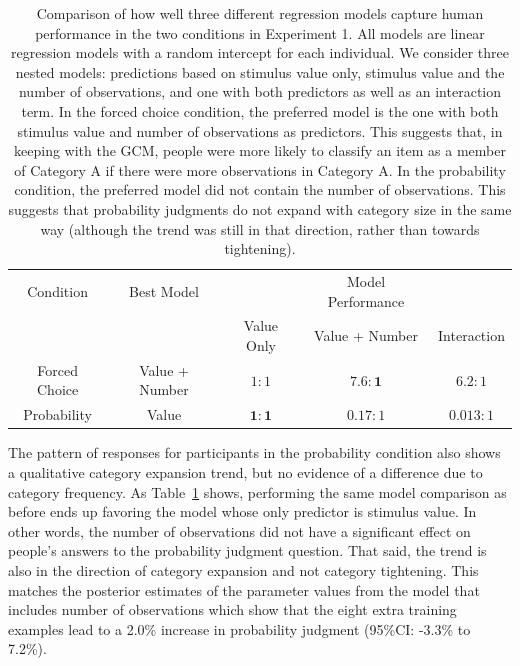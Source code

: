 \documentclass[doc,apacite]{apa6}
\begin{document}
\begin{table}[t]
  \centering
  \begin{tabular}{ccccc} %
    \toprule
    Condition & Best Model & & Model Performance & \\
    \cmidrule(lr){3-5}
    & & Value Only & Value + Number & Interaction \\
    \midrule
    Forced Choice & Value + Number & $ 1 : 1 $ & $ \mathbf{7.6 : 1} $ & $ 6.2 : 1 $ \\
    Probability & Value & $ \mathbf{1 : 1} $ & $ 0.17 : 1 $ & $ 0.013 : 1 $ \\
    \bottomrule
  \end{tabular}
  \vspace*{12pt}
  \caption{Comparison of how well three different regression models capture human performance in the two conditions in Experiment 1. All models are linear regression models with a random intercept for each individual. We consider three nested models: predictions based on stimulus value only, stimulus value and the number of observations, and one with both predictors as well as an interaction term. In the {\sc forced choice} condition, the preferred model is the one with both stimulus value and number of observations as predictors. This suggests that, in keeping with the GCM, people were more likely to classify an item as a member of Category A if there were more observations in Category A. In the {\sc probability} condition, the preferred model did not contain the number of observations. This suggests that probability judgments do not expand with category size in the same way (although the trend was still in that direction, rather than towards tightening).}
  \label{tab:expt1bayesfactors}
\end{table}


The pattern of responses for participants in the {\sc probability} condition also shows a qualitative category expansion trend, but no evidence of a difference due to category frequency. As Table~\ref{tab:expt1bayesfactors} shows, performing the same model comparison as before ends up favoring the model whose only predictor is stimulus value. In other words, the number of observations did not have a significant effect on people's answers to the probability judgment question. That said, the trend is also in the direction of category expansion and not category tightening. This matches the posterior estimates of the parameter values from the model that includes number of observations which show that the eight extra training examples lead to a 2.0\% increase in probability judgment (95\%CI: -3.3\% to 7.2\%). 
\end{document}

